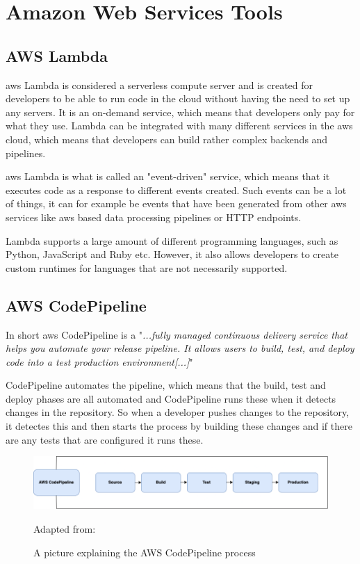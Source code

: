\section{Amazon Web Services Tools}
\subsection{AWS Lambda}
\acrshort{aws} Lambda is considered a serverless compute server and is created for developers to be able to run code in the cloud without having the need to set up any servers. It is an on-demand service, which means that developers only pay for what they use. Lambda can be integrated with many different services in the \acrshort{aws} cloud, which means that developers can build rather complex backends and pipelines. 

\acrshort{aws} Lambda is what is called an "event-driven" service, which means that it executes code as a response to different events created. Such events can be a lot of things, it can for example be events that have been generated from other \acrshort{aws} services like \acrshort{aws} based data processing pipelines or HTTP endpoints. 

Lambda supports a large amount of different programming languages, such as Python, JavaScript and Ruby etc. However, it also allows developers to create custom runtimes for languages that are not necessarily supported. \cite{AWSLamda}



\subsection{AWS CodePipeline}
In short \acrshort{aws} CodePipeline is a "\textit{...fully managed continuous delivery service that helps you automate your release pipeline. It allows users to build, test, and deploy code into a test production environment[...]}"
\cite{AWSCodePipeline}

CodePipeline automates the pipeline, which means that the build, test and deploy phases are all automated and CodePipeline runs these when it detects changes in the repository. So when a developer pushes changes to the repository, it detectes this and then starts the process by building these changes and if there are any tests that are configured it runs these. \cite{AWSCodePipeline1}
\begin{figure}[htp]
    \centering
    \includegraphics[width=1\columnwidth]{Images/CodePipeline.png}
    \caption{A picture explaining the AWS CodePipeline process}Adapted from: \cite{AWSCodePipeline2}
    \label{fig:my_label}
\end{figure}

